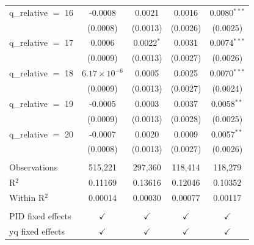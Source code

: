\begin{tabular}{lcccc}
   q\_relative $=$ 16   & -0.0008                & 0.0021         & 0.0016          & 0.0080$^{***}$\\   
                        & (0.0008)               & (0.0013)       & (0.0026)        & (0.0025)\\   
   q\_relative $=$ 17   & 0.0006                 & 0.0022$^{*}$   & 0.0031          & 0.0074$^{***}$\\   
                        & (0.0009)               & (0.0013)       & (0.0027)        & (0.0026)\\   
   q\_relative $=$ 18   & $6.17\times 10^{-6}$   & 0.0005         & 0.0025          & 0.0070$^{***}$\\   
                        & (0.0009)               & (0.0013)       & (0.0027)        & (0.0024)\\   
   q\_relative $=$ 19   & -0.0005                & 0.0003         & 0.0037          & 0.0058$^{**}$\\   
                        & (0.0009)               & (0.0013)       & (0.0028)        & (0.0025)\\   
   q\_relative $=$ 20   & -0.0007                & 0.0020         & 0.0009          & 0.0057$^{**}$\\   
                        & (0.0008)               & (0.0013)       & (0.0027)        & (0.0026)\\   
    \\
   Observations         & 515,221                & 297,360        & 118,414         & 118,279\\  
   R$^2$                & 0.11169                & 0.13616        & 0.12046         & 0.10352\\  
   Within R$^2$         & 0.00014                & 0.00030        & 0.00077         & 0.00117\\  
    \\
   PID fixed effects    & $\checkmark$           & $\checkmark$   & $\checkmark$    & $\checkmark$\\   
   yq fixed effects     & $\checkmark$           & $\checkmark$   & $\checkmark$    & $\checkmark$\\   
   \bottomrule
\end{tabular}
\par\endgroup



